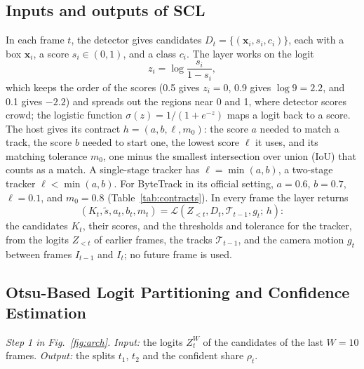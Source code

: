 \subsection{Inputs and outputs of SCL}\label{sec:problem}
In each frame $t$, the detector gives candidates $D_t=\{(\mathbf{x}_i,s_i,c_i)\}$, each with a box
$\mathbf{x}_i$, a score $s_i\in(0,1)$, and a class $c_i$. The layer works on the logit
\begin{equation}
z_i=\log\frac{s_i}{1-s_i},
\label{eq:logit}
\end{equation}
which keeps the order of the scores (0.5 gives $z_i=0$, 0.9 gives $\log9=2.2$, and 0.1 gives $-2.2$)
and spreads out the regions near 0 and 1, where detector scores crowd; the logistic function
$\sigma(z)=1/(1+e^{-z})$ maps a logit back to a score. The host gives its contract $h=(a,b,\ell,m_0)$:
the score $a$ needed to match a track, the score $b$ needed to start one, the lowest score $\ell$ it
uses, and its matching tolerance $m_0$, one minus the smallest intersection over union (IoU) that
counts as a match. A single-stage tracker has $\ell=\min(a,b)$, a two-stage tracker $\ell<\min(a,b)$.
For ByteTrack in its official setting, $a=0.6$, $b=0.7$, $\ell=0.1$, and $m_0=0.8$
(Table~\ref{tab:contracts}). In every frame the layer returns
\begin{equation}
\left(K_t,\tilde{s},a_t,b_t,m_t\right)=
\mathcal{L}\left(Z_{<t},D_t,\mathcal{T}_{t-1},g_t;\,h\right):
\label{eq:layer}
\end{equation}
the candidates $K_t$, their scores, and the thresholds and tolerance for the tracker, from the logits
$Z_{<t}$ of earlier frames, the tracks $\mathcal{T}_{t-1}$, and the camera motion $g_t$ between frames
$I_{t-1}$ and $I_t$; no future frame is used.



\subsection{Otsu-Based Logit Partitioning and Confidence Estimation}\label{sec:calib}
\emph{Step 1 in Fig.~\ref{fig:arch}. Input:} the logits $Z_t^W$ of the candidates of the last $W=10$
frames. \emph{Output:} the splits $t_1$, $t_2$ and the confident share $\rho_t$.

